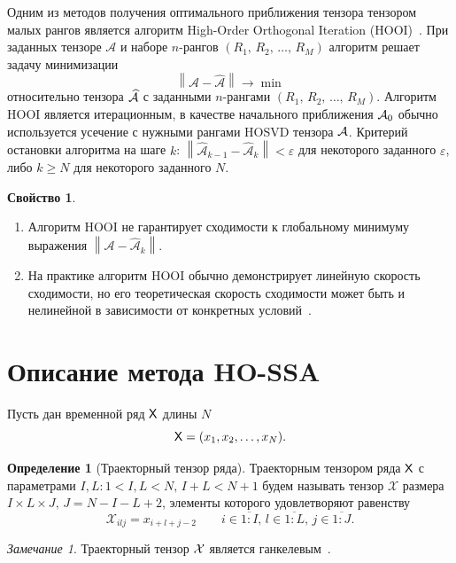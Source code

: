 \documentclass[specialist,
  substylefile=spbu_report.rtx,
subf,href,colorlinks=true, 12pt]{disser}
\theoremstyle{plain}
\theoremstyle{definition}
\newtheorem{definition}{Определение}[section]
\newtheorem{property}{Свойство}[section]
\theoremstyle{remark}
\newtheorem{remark}{Замечание}[section]
\begin{document}
Одним из методов получения оптимального приближения тензора тензором
малых рангов является алгоритм
High-Order Orthogonal Iteration (HOOI)~\cite{hooi, hooi-alg}.
При заданных тензоре $\mathcal{A}$ и наборе $n$-рангов $(R_1,\,
R_2,\, \ldots,\, R_M)$
алгоритм решает задачу минимизации
\[
  \left\|\mathcal{A}-\widehat{\mathcal{A}}\right\|\to \min
\]
относительно тензора $\widehat{\mathcal{A}}$ с заданными $n$-рангами
$(R_1,\, R_2,\, \ldots,\, R_M)$.
Алгоритм HOOI является итерационным, в качестве начального
приближения $\mathcal{A}_0$ обычно используется
усечение с нужными рангами HOSVD тензора $\mathcal{A}$.
Критерий остановки алгоритма на шаге $k$:
$\left\|\widehat{\mathcal{A}}_{k-1}-\widehat{\mathcal{A}}_k\right\| <
\varepsilon$
для некоторого заданного $\varepsilon$, либо $k \geqslant N$ для
некоторого заданного $N$.
\begin{property}
  \label{property:hooi-properties}
  \leavevmode
  \begin{enumerate}
    \item Алгоритм HOOI не гарантирует сходимости к глобальному
      минимуму выражения
      $\left\|\mathcal{A}-\widehat{\mathcal{A}}_k\right\|$.
    \item На практике алгоритм HOOI обычно демонстрирует линейную
      скорость сходимости, но его теоретическая скорость сходимости
      может быть и нелинейной в зависимости от конкретных
      условий~\cite{hooi-convergence}.
  \end{enumerate}
\end{property}

\section{Описание метода HO-SSA}\label{sec:HO-SSA-method-description}
Пусть дан временной ряд $\mathsf{X}$ длины $N$
\[
  \mathsf{X}=(x_1,x_2,\ldots,x_N).
\]
\begin{definition}[Траекторный тензор ряда]
  Траекторным тензором ряда $\mathsf{X}$ с параметрами $I,L: 1 < I,L < N,\,
  I + L < N + 1$
  будем называть тензор $\mathcal{X}$ размера $I\times L \times J,\,
  J=N-I-L+2$, элементы которого удовлетворяют равенству
  \[
    \mathcal{X}_{ilj}=x_{i+l+j-2}\qquad i\in \overline{1:I},\, l
    \in\overline{1:L},\, j \in\overline{1:J}.
  \]
\end{definition}

\begin{remark}
  Траекторный тензор $\mathcal{X}$ является ганкелевым~\cite{hankel-tensor}.
\end{remark}
\end{document}
